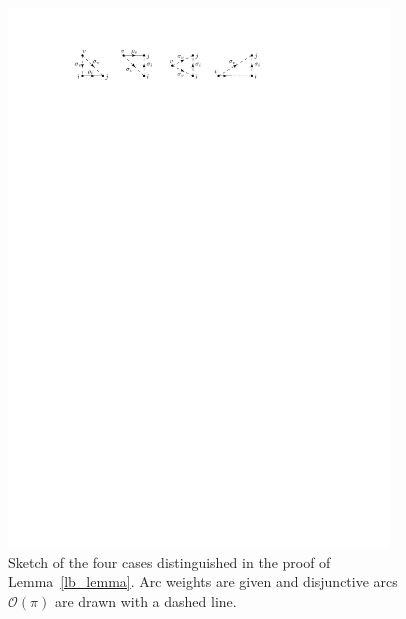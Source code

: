 \documentclass[a4paper]{article}
\theoremstyle{definition}
\theoremstyle{plain}
\begin{document}
\begin{figure}
  \centering
  \includegraphics[width=0.9\textwidth]{figures/single/lower-bound-lemma.pdf}
  \caption{Sketch of the four cases distinguished in the proof of
    Lemma~\ref{lb_lemma}. Arc weights are given and disjunctive arcs
    $\mathcal{O}(\pi)$ are drawn with a dashed line.}\label{fig:lb_lemma}
\end{figure}
\end{document}

